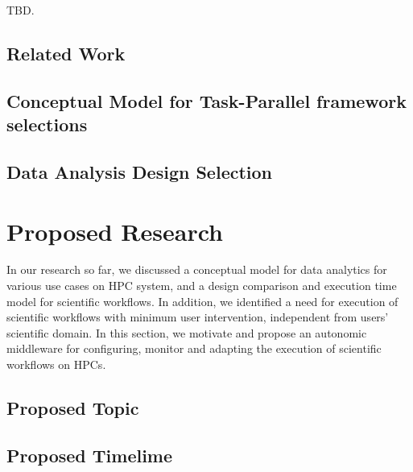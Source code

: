 TBD.

\subsection{Related Work}
\label{relatedwork}




\subsection{Conceptual Model for Task-Parallel framework selections}

\subsection{Data Analysis Design Selection}


\section{Proposed Research}

In our research so far, we discussed a conceptual model for data analytics for 
various use cases on HPC system, and a design comparison and execution time 
model for scientific workflows. In addition, we identified a need for execution 
of  scientific workflows with minimum user intervention, independent from 
users' scientific domain. In this section, we motivate and propose an 
autonomic middleware for configuring, monitor and adapting the execution of 
scientific workflows on HPCs.

\subsection{Proposed Topic}



\subsection{Proposed Timelime}




